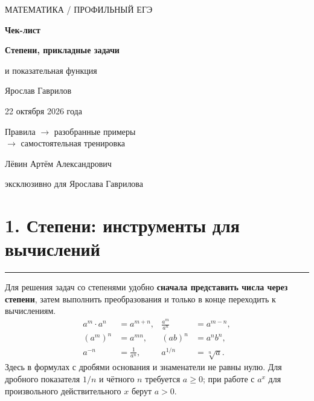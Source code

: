 \documentclass[a4paper,12pt]{article}
\newcommand{\sectionline}{\par\vspace{2pt}\noindent\textcolor{accent}{\rule{\linewidth}{0.5pt}}\par\vspace{3pt}}
\newcommand{\focus}[1]{\textbf{\textcolor{darkaccent}{#1}}}
\begin{document}
\begin{titlepage}
\thispagestyle{empty}
\begin{center}
\vspace*{40mm}
{\large\color{softgray} МАТЕМАТИКА \enspace / \enspace ПРОФИЛЬНЫЙ ЕГЭ}\par
\vspace{13mm}
{\fontsize{36}{42}\selectfont\bfseries\color{darkaccent} Чек-лист}\par
\vspace{7mm}
{\LARGE\bfseries Степени, прикладные задачи\par и показательная функция}\par
\vspace{14mm}
{\large Ярослав Гаврилов}\par
\vspace{3mm}
{\large 22 октября 2026 года}\par
\vspace{15mm}
{\large\color{textgray} Правила \(\longrightarrow\) разобранные примеры \\ \(\longrightarrow\) самостоятельная тренировка}\par
\vfill
{\normalsize\color{softgray} Лёвин Артём Александрович}\par
{\normalsize\color{softgray} эксклюзивно для Ярослава Гаврилова}\par
\end{center}
\end{titlepage}
\setcounter{page}{1}
\section*{1. Степени: инструменты для вычислений}
\sectionline
Для решения задач со степенями удобно \focus{сначала представить числа через степени}, затем выполнить преобразования и только в конце переходить к вычислениям.
\[
\begin{aligned}
 a^m\cdot a^n&=a^{m+n}, &\frac{a^m}{a^n}&=a^{m-n},\\
 (a^m)^n&=a^{mn}, &(ab)^n&=a^n b^n,\\
 a^{-n}&=\frac{1}{a^n}, &a^{1/n}&=\sqrt[n]{a}.
\end{aligned}
\]
Здесь в формулах с дробями основания и знаменатели не равны нулю. Для дробного показателя \(1/n\) и чётного \(n\) требуется \(a\ge 0\); при работе с \(a^x\) для произвольного действительного \(x\) берут \(a>0\).
\end{document}
